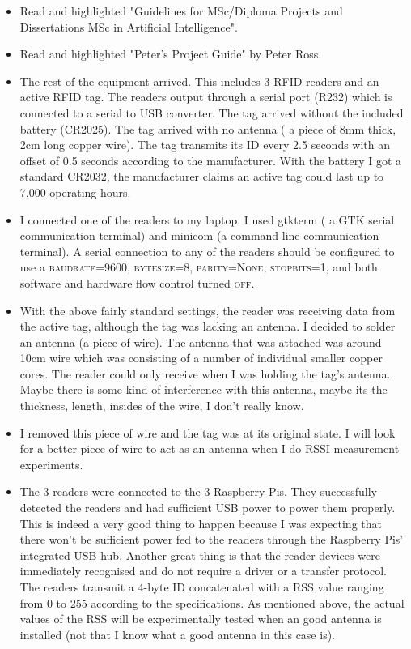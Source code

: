 \documentclass[a4paper,12pt]{article}
\begin{document}
\begin{itemize}
	\item Read and highlighted "Guidelines for MSc/Diploma Projects and Dissertations MSc in Artificial Intelligence".
	\item Read and highlighted "Peter's Project Guide" by Peter Ross.
	\item The rest of the equipment arrived. This includes 3 RFID readers and an active RFID tag. The readers output through a serial port (R232) which is connected to a serial to USB converter. The tag arrived without the included battery (CR2025). The tag arrived with no antenna ( a piece of 8mm thick, 2cm long copper wire). The tag transmits its ID every 2.5 seconds with an offset of 0.5 seconds according to the manufacturer. With the battery I got a standard CR2032, the manufacturer claims an active tag could last up to 7,000 operating hours.
	\item I connected one of the readers to my laptop. I used \textsf{gtkterm} ( a GTK serial communication terminal) and \textsf{minicom} (a command-line communication terminal). A serial connection to any of the readers should be configured to use a \textsc{baudrate=9600, bytesize=8, parity=None, stopbits=1}, and both software and hardware flow control turned \textsc{off}.
	\item With the above fairly standard settings, the reader was receiving data from the active tag, although the tag was lacking an antenna. I decided to solder an antenna (a piece of wire). The antenna that was attached was around 10cm wire which was consisting of a number of individual smaller copper cores. The reader could only receive when I was holding the tag's antenna. Maybe there is some kind of interference with this antenna, maybe its the thickness, length, insides of the wire, I don't really know.
	\item I removed this piece of wire and the tag was at its original state. I will look for a better piece of wire to act as an antenna when I do RSSI measurement experiments.
	\item The 3 readers were connected to the 3 Raspberry Pis. They successfully detected the readers and had sufficient USB power to power them properly. This is indeed a very good thing to happen because I was expecting that there won't be sufficient power fed to the readers through the Raspberry Pis' integrated USB hub. Another great thing is that the reader devices were immediately recognised and do not require a driver or a transfer protocol. The readers transmit a 4-byte ID concatenated with a RSS value ranging from 0 to 255 according to the specifications. As mentioned above, the actual values of the RSS will be experimentally tested when an good antenna is installed (not that I know what a good antenna in this case is).

\end{itemize}
\end{document}
